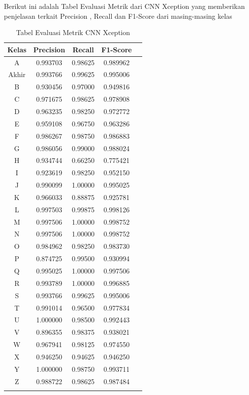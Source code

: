 Berikut ini adalah Tabel Evaluasi Metrik dari CNN Xception yang memberikan penjelasan terkait Precision , Recall dan F1-Score dari masing-masing kelas 

\begin{table}[h]
	\centering
	\caption{Tabel Evaluasi Metrik CNN Xception}
	\begin{tabular}{|c|c|c|c|c|}
	\hline
	Kelas & Precision & Recall & F1-Score \\
	\hline
	A & 0.993703 & 0.98625 & 0.989962 \\
	Akhir & 0.993766 & 0.99625 & 0.995006 \\
	B & 0.930456 & 0.97000 & 0.949816 \\
	C & 0.971675 & 0.98625 & 0.978908 \\
	D & 0.963235 & 0.98250 & 0.972772 \\
	E & 0.959108 & 0.96750 & 0.963286 \\
	F & 0.986267 & 0.98750 & 0.986883 \\
	G & 0.986056 & 0.99000 & 0.988024 \\
	H & 0.934744 & 0.66250 & 0.775421 \\
	I & 0.923619 & 0.98250 & 0.952150 \\
	J & 0.990099 & 1.00000 & 0.995025 \\
	K & 0.966033 & 0.88875 & 0.925781 \\
	L & 0.997503 & 0.99875 & 0.998126 \\
	M & 0.997506 & 1.00000 & 0.998752 \\
	N & 0.997506 & 1.00000 & 0.998752 \\
	O & 0.984962 & 0.98250 & 0.983730 \\
	P & 0.874725 & 0.99500 & 0.930994 \\
	Q & 0.995025 & 1.00000 & 0.997506 \\
	R & 0.993789 & 1.00000 & 0.996885 \\
	S & 0.993766 & 0.99625 & 0.995006 \\
	T & 0.991014 & 0.96500 & 0.977834 \\
	U & 1.000000 & 0.98500 & 0.992443 \\
	V & 0.896355 & 0.98375 & 0.938021 \\
	W & 0.967941 & 0.98125 & 0.974550 \\
	X & 0.946250 & 0.94625 & 0.946250 \\
	Y & 1.000000 & 0.98750 & 0.993711 \\
	Z & 0.988722 & 0.98625 & 0.987484 \\
	\hline
	\label{tab:tabelevaluasicnnxception}
	\end{tabular}
	\end{table}

